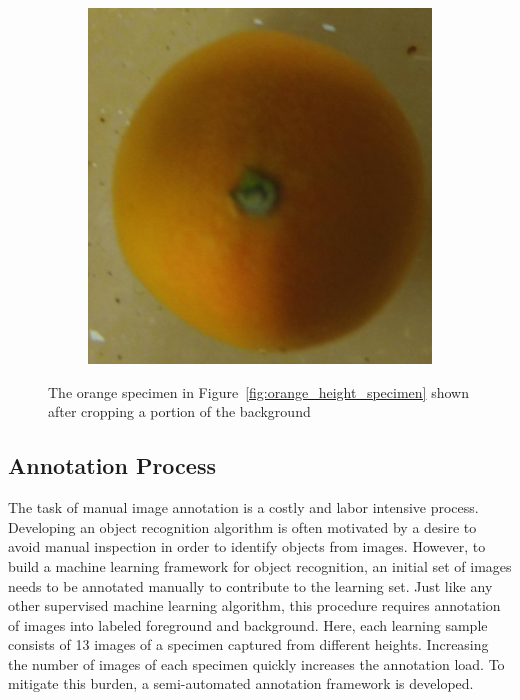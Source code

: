 \documentclass {udthesis}
\begin{document}
\begin{figure}
\begin{subfigure}[]{0.12\textwidth}
      \caption{}
  \end{subfigure}
  \begin{subfigure}[]{0.12\textwidth}
      \includegraphics[width=\textwidth]{orange4_obj_11/orange4_011_08}
      \caption{}
  \end{subfigure}
\caption[Images of an orange specimen after cropping a portion of background]{The orange specimen in Figure~\ref{fig:orange_height_specimen} shown after cropping a portion of the background}
\label{fig:orange_height_specimen_cropped}
\end{figure}	


\subsection{Annotation Process}
\label{sec:distdes_annotation}

The task of manual image annotation is a costly and labor intensive process. Developing an object recognition algorithm is often motivated by a desire to avoid manual inspection in order to identify objects from images. However, to build a machine learning framework for object recognition, an initial set of images needs to be annotated manually to contribute to the learning set. 
Just like any other supervised machine learning algorithm, this procedure requires annotation of images into labeled foreground and background. Here, each learning sample consists of 13 images of a specimen captured from different heights. Increasing the number of images of each specimen quickly increases the annotation load. To mitigate this burden, a semi-automated annotation framework is developed.
\end{document}
